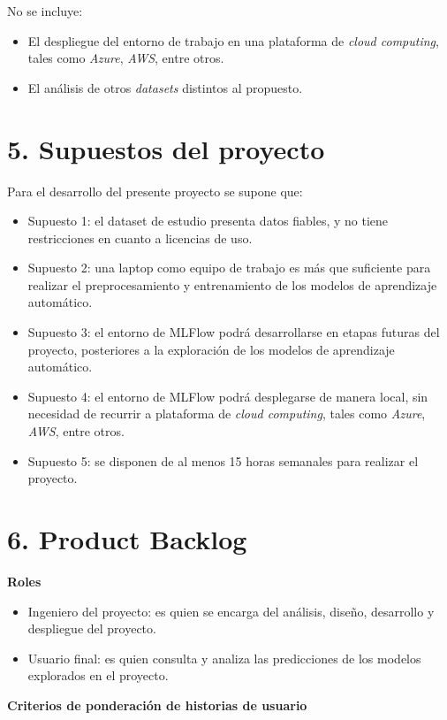 \documentclass[
11pt, %
]{charter}
\begin{document}
No se incluye:
\begin{itemize}
    \item El despliegue del entorno de trabajo en una plataforma de \textit{cloud computing}, tales como \textit{Azure}, \textit{AWS}, entre otros.
    \item El análisis de otros \textit{datasets} distintos al propuesto.
\end{itemize}

\section{5. Supuestos del proyecto}
\label{sec:supuestos}

Para el desarrollo del presente proyecto se supone que:
\begin{itemize}
	\item Supuesto 1: el dataset de estudio presenta datos fiables, y no tiene restricciones en cuanto a licencias de uso.
	\item Supuesto 2: una laptop como equipo de trabajo es más que suficiente para realizar el preprocesamiento y entrenamiento de los modelos de aprendizaje automático.
	\item Supuesto 3: el entorno de MLFlow podrá desarrollarse en etapas futuras del proyecto, posteriores a la exploración de los modelos de aprendizaje automático.
    \item Supuesto 4: el entorno de MLFlow podrá desplegarse de manera local, sin necesidad de recurrir a plataforma de \textit{cloud computing}, tales como \textit{Azure}, \textit{AWS}, entre otros.
    \item Supuesto 5: se disponen de al menos 15 horas semanales para realizar el proyecto.
\end{itemize}

\section{6. Product Backlog}
\label{sec:backlog}
\textbf{Roles}
\begin{itemize}
    \item Ingeniero del proyecto: es quien se encarga del análisis, diseño, desarrollo y despliegue del proyecto.
    \item Usuario final: es quien consulta y analiza las predicciones de los modelos explorados en el proyecto.
\end{itemize}

\textbf{Criterios de ponderación de historias de usuario}
\end{document}
